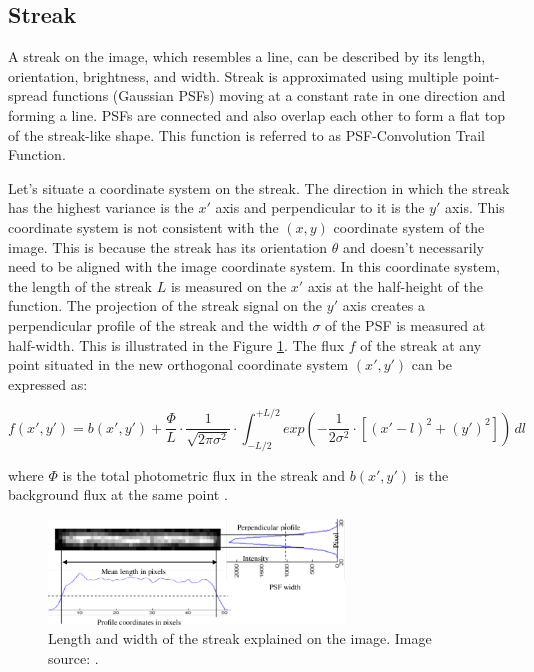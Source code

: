 \subsection{Streak}

A streak on the image, which resembles a line, can be described by its length, orientation, brightness, and width. 
Streak is approximated using multiple point-spread functions (Gaussian PSFs) moving at a constant rate in one direction and forming a line. PSFs are connected and also overlap each other to form a flat top of the streak-like shape. This function is referred to as PSF-Convolution Trail Function. %

Let's situate a coordinate system on the streak. The direction in which the streak has the highest variance is the $x'$ axis and perpendicular to it is the $y'$ axis. This coordinate system is not consistent with the $(x,y)$ coordinate system of the image. This is because the streak has its orientation $\theta$ and doesn't necessarily need to be aligned with the image coordinate system. 
In this coordinate system, the length of the streak $L$ is measured on the $x'$ axis at the half-height of the function. The projection of the streak signal on the $y'$ axis creates a perpendicular profile of the streak and the width $\sigma$ of the PSF is measured at half-width. This is illustrated in the Figure \ref{img:line0}. 
The flux $f$ of the streak at any point situated in the new orthogonal coordinate system $(x',y')$ can be expressed as:

\begin{equation}
    f(x',y') = b(x',y') + \frac{\Phi}{L} \cdot \frac{1}{\sqrt{2 \pi \sigma^2}} \cdot \int_{-L/2}^{+L/2} 
    exp \left(  
        - \frac{1}{2 \sigma^2} \cdot \left[ (x' - l)^2 + (y')^2 \right]
    \right) \,dl
\end{equation}

where $\Phi$ is the total photometric flux in the streak and $b(x',y')$ is the background flux at the same point \cite{thesisNagy}. 


\begin{figure}[h]
    \centering
    \includegraphics[width=0.7\textwidth]{images/line.png}
    \caption[Length and width of the streak on the image]
    {Length and width of the streak explained on the image.
    Image source: \cite{articleStreaks}.}
    \label{img:line0}
\end{figure}


